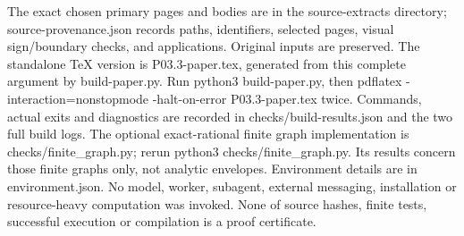 \documentclass[11pt]{article}
\begin{document}
The exact chosen primary pages and bodies are in the source-extracts directory; source-provenance.json records paths, identifiers, selected pages, visual sign/boundary checks, and applications. Original inputs are preserved. The standalone TeX version is P03.3-paper.tex, generated from this complete argument by build-paper.py. Run python3 build-paper.py, then pdflatex -interaction=nonstopmode -halt-on-error P03.3-paper.tex twice. Commands, actual exits and diagnostics are recorded in checks/build-results.json and the two full build logs. The optional exact-rational finite graph implementation is checks/finite\_graph.py; rerun python3 checks/finite\_graph.py. Its results concern those finite graphs only, not analytic envelopes. Environment details are in environment.json. No model, worker, subagent, external messaging, installation or resource-heavy computation was invoked. None of source hashes, finite tests, successful execution or compilation is a proof certificate.
\end{document}
